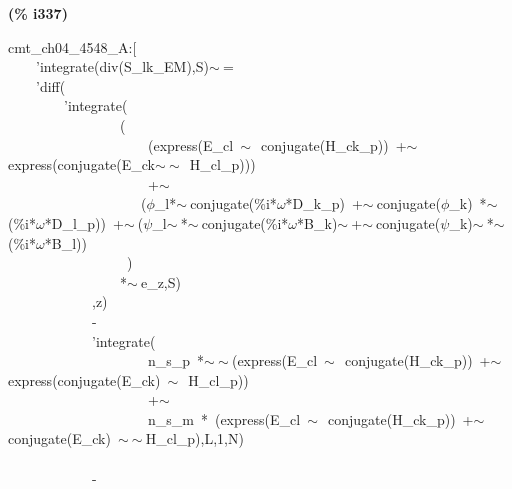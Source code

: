 \documentclass[fleqn]{article}
\begin{document}
\noindent
\begin{minipage}[t]{4.000000em}\color{red}\bfseries
(\% i337)	
\end{minipage}
\begin{minipage}[t]{\textwidth}\color{blue}
cmt\_ch04\_4548\_A:[\\
\ \ \ \ 'integrate(div(S\_lk\_EM),S)\ensuremath{\sim\ }=\ \\
\ \ \ \ 'diff(\\
\ \ \ \ \ \ \ \ 'integrate(\ \\
\ \ \ \ \ \ \ \ \ \ \ \ \ \ \ \ (\\
\ \ \ \ \ \ \ \ \ \ \ \ \ \ \ \ \ \ \ \ (express(E\_cl\ \ensuremath{\sim\ }\ conjugate(H\_ck\_p))\ +\ensuremath{\sim\ }express(conjugate(E\_ck\ensuremath{\sim\ }\ensuremath{\sim\ }\ H\_cl\_p)))\\
\ \ \ \ \ \ \ \ \ \ \ \ \ \ \ \ \ \ \ \ +\ensuremath{\sim\ }\\
\ \ \ \ \ \ \ \ \ \ \ \ \ \ \ \ \ \ \ (\ensuremath{\phi}\_l*\ensuremath{\sim\ }conjugate(\%i*\ensuremath{\omega}*D\_k\_p)\ +\ensuremath{\sim\ }conjugate(\ensuremath{\phi}\_k)\ *\ensuremath{\sim\ }(\%i*\ensuremath{\omega}*D\_l\_p))\ +\ensuremath{\sim\ }(\ensuremath{\psi}\_l\ensuremath{\sim\ }*\ensuremath{\sim\ }conjugate(\%i*\ensuremath{\omega}*B\_k)\ensuremath{\sim\ }+\ensuremath{\sim\ }conjugate(\ensuremath{\psi}\_k)\ensuremath{\sim\ }*\ensuremath{\sim\ }(\%i*\ensuremath{\omega}*B\_l))\\
\ \ \ \ \ \ \ \ \ \ \ \ \ \ \ \ \ )\\
\ \ \ \ \ \ \ \ \ \ \ \ \ \ \ \ *\ensuremath{\sim\ }e\_z,S)\\
\ \ \ \ \ \ \ \ \ \ \ \ ,z)\\
\ \ \ \ \ \ \ \ \ \ \ \ -\ \\
\ \ \ \ \ \ \ \ \ \ \ \ 'integrate(\ \\
\ \ \ \ \ \ \ \ \ \ \ \ \ \ \ \ \ \ \ \ n\_s\_p\ *\ensuremath{\sim\ }\ensuremath{\sim\ }(express(E\_cl\ \ensuremath{\sim\ }\ conjugate(H\_ck\_p))\ +\ensuremath{\sim\ }express(conjugate(E\_ck)\ \ensuremath{\sim\ }\ H\_cl\_p))\ \\
\ \ \ \ \ \ \ \ \ \ \ \ \ \ \ \ \ \ \ \ +\ensuremath{\sim\ }\\
\ \ \ \ \ \ \ \ \ \ \ \ \ \ \ \ \ \ \ \ n\_s\_m\ *\ (express(E\_cl\ \ensuremath{\sim\ }\ conjugate(H\_ck\_p))\ +\ensuremath{\sim\ }conjugate(E\_ck)\ \ensuremath{\sim\ }\ensuremath{\sim\ }H\_cl\_p),L,1,N)\\
\ \ \ \ \\
\ \ \ \ \ \ \ \ \ \ \ \ -\ \\

\end{minipage}
\end{document}
